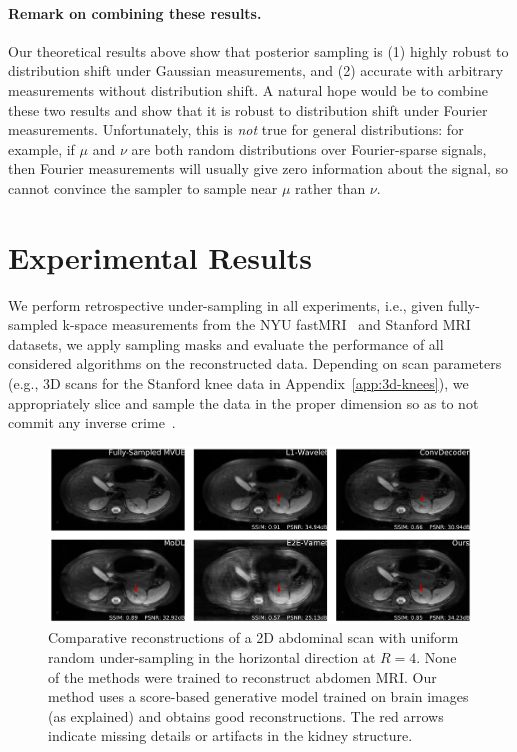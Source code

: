 \documentclass{article}
\newcounter{example}[section]
\begin{document}
\paragraph{Remark on combining these results.}  Our theoretical results above show that posterior sampling is (1) highly robust to distribution shift under Gaussian measurements, and (2) accurate with arbitrary measurements without distribution shift.  A natural hope would be to combine these two results and show that it is robust to distribution shift under Fourier measurements.  Unfortunately, this is \emph{not} true for general distributions: for example, if $\mu$ and $\nu$ are both random distributions over Fourier-sparse signals, then Fourier measurements will usually give zero information about the signal, so cannot convince the sampler to sample near $\mu$ rather than $\nu$.


\section{Experimental Results}\label{sec:exp}
We perform retrospective under-sampling in all experiments, i.e., given fully-sampled k-space measurements from the NYU fastMRI~\cite{knoll2020fastmri,zbontar2018fastMRI} and Stanford MRI~\cite{mridataorg} datasets, we apply sampling masks and evaluate the performance of all considered algorithms on the reconstructed data. Depending on scan parameters (e.g., 3D scans for the Stanford knee data in Appendix~\ref{app:3d-knees}), we appropriately slice and sample the data in the proper dimension so as to not commit any inverse crime~\cite{guerquin2011realistic,shimron2021subtle}.

\begin{figure}
\begin{center}
    \includegraphics[width=\columnwidth]{abdomen-random-horizontal-R=4-slice=9-comp-annotated.pdf}
\end{center}
\caption{\small Comparative reconstructions of a 2D abdominal scan
    with uniform random under-sampling in the horizontal direction at
    $R=4$. None of the methods were trained to reconstruct abdomen
    MRI. Our method uses a score-based generative model trained on
    brain images (as explained) and obtains good reconstructions. The
    red arrows indicate missing details or artifacts in the kidney
    structure. 
}
\label{fig:abdomen-equi-horizontal-recons}
\end{figure}
\end{document}
